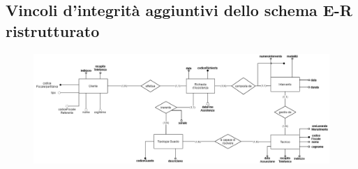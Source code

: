 \documentclass[legalpaper]{article}
\begin{document}
\subsection{Vincoli d'integrità aggiuntivi dello schema E-R ristrutturato}
\begin{figure}[h]
	\centering
	\includegraphics[width=0.9\linewidth]{image/er_ristrutturato}
	\caption{}
	\label{fig:erristrutturato}
\end{figure}
\end{document}
